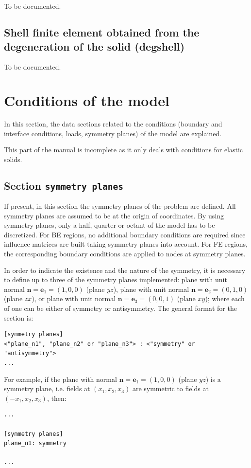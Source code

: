 \documentclass[a4paper,fleqn]{book}
\begin{document}
To be documented.

\subsection{Shell finite element obtained from the degeneration of the solid (degshell)}

To be documented.

\section{Conditions of the model}

In this section, the data sections related to the conditions (boundary and interface conditions, loads, symmetry planes) of the model are explained. 

This part of the manual is incomplete as it only deals with conditions for elastic solids.

\subsection{Section \texttt{symmetry planes}}
If present, in this section the symmetry planes of the problem are defined. All symmetry planes are assumed to be at the origin of coordinates. By using symmetry planes, only a half, quarter or octant of the model has to be discretized. For BE regions, no additional boundary conditions are required since influence matrices are built taking symmetry planes into account. For FE regions, the corresponding boundary conditions are applied to nodes at symmetry planes.

In order to indicate the existence and the nature of the symmetry, it is necessary to define up to three of the symmetry planes implemented: plane with unit normal $\mathbf{n}=\mathbf{e}_1=(1,0,0)$ (plane $yz$), plane with unit normal $\mathbf{n}=\mathbf{e}_2=(0,1,0)$ (plane $zx$), or plane with unit normal $\mathbf{n}=\mathbf{e}_3=(0,0,1)$ (plane $xy$); where each of one can be either of symmetry or antisymmetry. The general format for the section is:
\begin{Verbatim}[frame=single, fontsize=\small, label={general format of section [symmetry planes]}]
[symmetry planes]
<"plane_n1", "plane_n2" or "plane_n3"> : <"symmetry" or "antisymmetry">
...
\end{Verbatim} 
For example, if the plane with normal $\mathbf{n}=\mathbf{e}_1=(1,0,0)$ (plane $yz$) is a symmetry plane, i.e. fields at $(x_1,x_2,x_3)$ are symmetric to fields at $(-x_1,x_2,x_3)$, then:
\begin{Verbatim}[frame=single, fontsize=\small, label={input.dat}]
...

[symmetry planes]
plane_n1: symmetry

...
\end{Verbatim}
\end{document}
